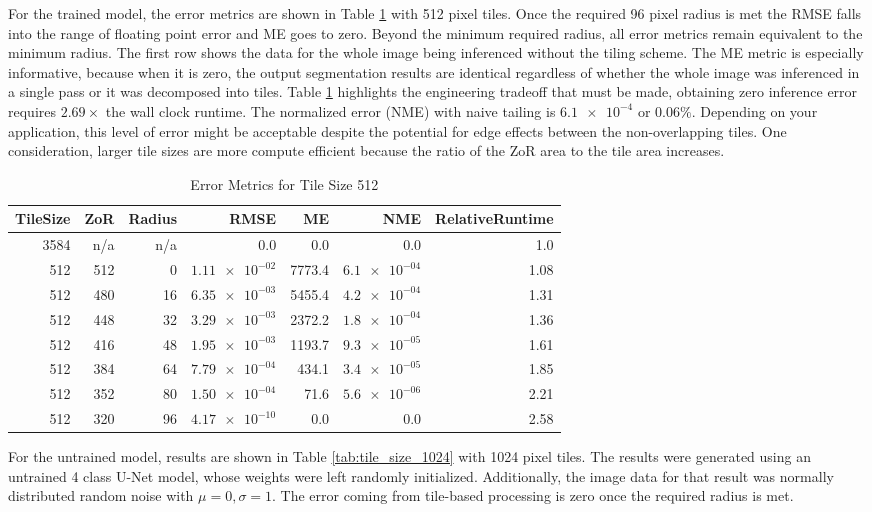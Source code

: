 \documentclass[runningheads]{llncs}
\begin{document}
For the trained model, the error metrics are shown in Table \ref{tab:tile_size_512} with 512 pixel tiles. Once the required 96 pixel radius is met the RMSE falls into the range of floating point error and ME goes to zero. Beyond the minimum required radius, all error metrics remain equivalent to the minimum radius. The first row shows the data for the whole image being inferenced without the tiling scheme. 
The ME metric is especially informative, because when it is zero, the output segmentation results are identical regardless of whether the whole image was inferenced in a single pass or it was decomposed into tiles. Table \ref{tab:tile_size_512} highlights the engineering tradeoff that must be made, obtaining zero inference error requires $2.69 \times$ the wall clock runtime. The normalized error (NME) with naive tailing is $\num{6.1e-4}$ or $\num{0.06} \%$. Depending on your application, this level of error might be acceptable despite the potential for edge effects between the non-overlapping tiles. One consideration, larger tile sizes are more compute efficient because the ratio of the ZoR area to the tile area increases. 

\begin{table}[h!]
	\centering
\caption{Error Metrics for Tile Size 512}
\label{tab:tile_size_512}
\begin{tabular}{r|r|r|r|r|r|r}
	TileSize & ZoR & Radius & RMSE    & ME & NME & RelativeRuntime \\ 
	\hline
3584 & n/a & n/a & 0.0 & 0.0 & 0.0 & 1.0 \\
512 & 512 & 0 & $\num{1.11e-02}$ & 7773.4 & $\num{6.1e-04}$ & 1.08 \\
512 & 480 & 16 & $\num{6.35e-03}$ & 5455.4 & $\num{4.2e-04}$ & 1.31 \\
512 & 448 & 32 & $\num{3.29e-03}$ & 2372.2 & $\num{1.8e-04}$ & 1.36 \\
512 & 416 & 48 & $\num{1.95e-03}$ & 1193.7 & $\num{9.3e-05}$ & 1.61 \\
512 & 384 & 64 & $\num{7.79e-04}$ & 434.1 & $\num{3.4e-05}$ & 1.85 \\
512 & 352 & 80 & $\num{1.50e-04}$ & 71.6 & $\num{5.6e-06}$ & 2.21 \\
512 & 320 & 96 & $\num{4.17e-10}$ & 0.0 & 0.0 & 2.58 \\
\end{tabular}
\end{table}

For the untrained model, results are shown in Table \ref{tab:tile_size_1024} with 1024 pixel tiles. The results were generated using an untrained 4 class U-Net model, whose weights were left randomly initialized. Additionally, the image data for that result was normally distributed random noise with $\mu = 0, \sigma = 1$. The error coming from tile-based processing is zero once the required radius is met.
\end{document}

